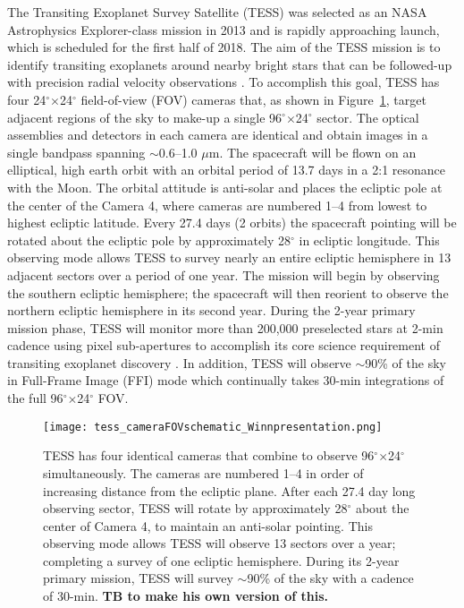 \documentclass[modern]{aastex61}
\begin{document}
The Transiting Exoplanet Survey Satellite (TESS) was selected as an NASA Astrophysics Explorer-class mission in 2013 and is rapidly approaching launch, which is scheduled for the first half of 2018. The aim of the TESS mission is to identify transiting exoplanets around nearby bright stars that can be followed-up with precision radial velocity observations \citep{Ricker2015}. To accomplish this goal, TESS has four 24$^{\circ}$$\times$24$^{\circ}$ field-of-view (FOV) cameras that, as shown in Figure~\ref{fig:cameras}, target adjacent regions of the sky to make-up a single 96$^{\circ}$$\times$24$^{\circ}$ sector. The optical assemblies and detectors in each camera are identical and obtain images in a single bandpass spanning $\sim$0.6--1.0 $\mu$m. The spacecraft will be flown on an elliptical, high earth orbit with an orbital period of 13.7 days in a 2:1 resonance with the Moon. The orbital attitude is anti-solar and places the ecliptic pole at the center of the Camera 4, where cameras are numbered 1--4 from lowest to highest ecliptic latitude. Every 27.4 days (2 orbits) the spacecraft pointing will be rotated about the ecliptic pole by approximately 28$^{\circ}$ in ecliptic longitude. This observing mode allows TESS to survey nearly an entire ecliptic hemisphere in 13 adjacent sectors over a period of one year. The mission will begin by observing the southern ecliptic hemisphere; the spacecraft will then reorient to observe the northern ecliptic hemisphere in its second year. During the 2-year primary mission phase, TESS will monitor more than 200,000 preselected stars at 2-min cadence using pixel sub-apertures to accomplish its core science requirement of transiting exoplanet discovery \citep{Sullivan2015}. In addition, TESS will observe $\sim$90\% of the sky in Full-Frame Image (FFI) mode which continually takes 30-min integrations of the full 96$^{\circ}$$\times$24$^{\circ}$ FOV. 

\begin{figure}
\centering
\texttt{[image: tess\_cameraFOVschematic\_Winnpresentation.png]}
\caption{TESS has four identical cameras that combine to observe 96$^{\circ}$$\times$24$^{\circ}$ simultaneously. The cameras are numbered 1--4 in order of increasing distance from the ecliptic plane. After each 27.4 day long observing sector, TESS will rotate by approximately 28$^{\circ}$ about the center of Camera 4, to maintain an anti-solar pointing. This observing mode allows TESS will observe 13 sectors over a year; completing a survey of one ecliptic hemisphere. During its 2-year primary mission, TESS will survey $\sim$90\% of the sky with a cadence of 30-min.
\textbf{TB to make his own version of this.}}
\label{fig:cameras}
\end{figure}
\end{document}
